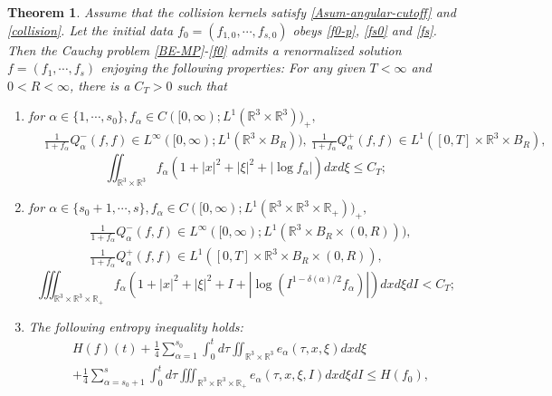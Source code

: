 \documentclass[reqno,11pt]{amsart}
\newtheorem{theorem}{Theorem}[section]
\numberwithin{equation}{section}
\def\R{\mathbb{R}}
\begin{document}
\begin{theorem}\label{MainThm}
Assume that the collision kernels satisfy \eqref{Asum-angular-cutoff} and \eqref{collision}. Let the initial data $f_0 = (f_{1,0}, \cdots, f_{s,0})$ obeys \eqref{f0-p}, \eqref{fs0} and \eqref{fs}. Then the Cauchy problem \eqref{BE-MP}-\eqref{f0} admits a renormalized solution $f=(f_1,\cdots,f_s)$ enjoying the following properties: For any given $T<\infty$ and $0 < R < \infty$, there is a $C_T > 0$ such that
\begin{enumerate}
	\item {for $\alpha \in \{1,\cdots,s_0\},f_\alpha \in C([0,\infty); L^1 (\R^3 \times \R^3))_+,$
	\begin{equation}\label{Qa}
		\begin{aligned}
			&\tfrac{1}{1+f_\alpha} Q^-_{\alpha} (f,f) \in L^\infty ([0,\infty);L^1 (\R^3 \times B_R)), \ \tfrac{1}{1+f_\alpha} Q^+_{\alpha} (f,f) \in L^1 ([0,T]\times \R^3 \times B_R),
		\end{aligned}
	\end{equation}
	\begin{equation}\label{fa}
	\iint_{\R^3 \times \R^3 } f_\alpha (1+|x|^2 +|\xi|^2 +|\log f_\alpha|)dxd\xi \leq C_T;
	\end{equation}	}
	\item{for $\alpha \in \{s_0+1,\cdots,s\},f_\alpha \in C([0,\infty); L^1 (\R^3 \times \R^3\times \R_+))_+,$
		\begin{equation}\label{Qb}
			\begin{aligned}
				&\tfrac{1}{1+f_\alpha} Q^-_{\alpha} (f,f) \in L^\infty ([0,\infty);L^1 (\R^3 \times B_R \times (0,R))), \\
				&\tfrac{1}{1+f_\alpha} Q^+_{\alpha} (f,f) \in L^1 ([0,T] \times \R^3 \times B_R \times (0,R)),
			\end{aligned}
		\end{equation}
	\begin{equation}\label{fb}
\iiint_{\R^3 \times \R^3 \times \R_+} f_\alpha (1+|x|^2 +|\xi|^2 +I + |\log (I^{1-\delta(\alpha)/2}f_\alpha)|)dxd\xi dI<C_T;
		\end{equation}}
	\item{ The following entropy inequality holds:
	\begin{equation}\label{entropy-th}
	\begin{aligned}
		&H(f)(t)+ \tfrac{1}{4}\sum \limits_{\alpha =1}^{s_0} \int_{0}^{t} d \tau \iint_{ \R^3 \times \R^3 } e_\alpha(\tau,x,\xi ) dxd\xi\\
		& +\tfrac{1}{4}\sum \limits_{\alpha =s_0+1}^{s}\int_{0}^{t} d \tau \iiint_{ \R^3 \times \R^3 \times \R_+}  e_\alpha(\tau,x,\xi ,I) dxd\xi dI\leq H(f_0),

\end{aligned}
\end{equation}}
\end{enumerate}
\end{theorem}
\end{document}
